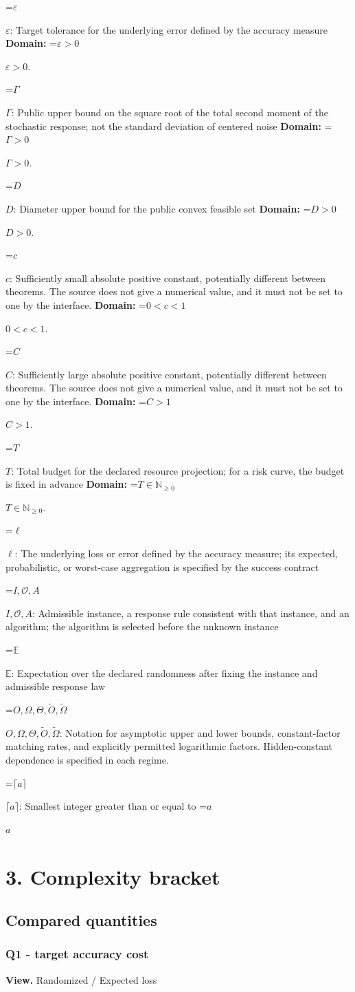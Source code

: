 \documentclass[10pt,a4paper]{article}
\newcommand{\AtlasMath}[1]{\par\begingroup\centering\setbox0=\hbox{$\displaystyle #1$}\ifdim\wd0>1.4\linewidth\typeout{ATLAS WIDE FORMULA: \the\wd0}\fi\ifdim\wd0>\linewidth\resizebox{\linewidth}{!}{\box0}\else\box0\fi\par\endgroup}
\newcommand{\AtlasInlineMath}[1]{\begingroup\setbox0=\hbox{$#1$}\ifdim\wd0>.4\linewidth\endgroup\AtlasMath{#1}\else\endgroup$#1$\fi}
\begin{document}
\AtlasInlineMath{\varepsilon}: Target tolerance for the underlying error defined by the accuracy measure \textbf{Domain:} \AtlasInlineMath{\varepsilon>0}.

\AtlasInlineMath{\Gamma}: Public upper bound on the square root of the total second moment of the stochastic response; not the standard deviation of centered noise \textbf{Domain:} \AtlasInlineMath{\Gamma>0}.

\AtlasInlineMath{D}: Diameter upper bound for the public convex feasible set \textbf{Domain:} \AtlasInlineMath{D>0}.

\AtlasInlineMath{c}: Sufficiently small absolute positive constant, potentially different between theorems. The source does not give a numerical value, and it must not be set to one by the interface. \textbf{Domain:} \AtlasInlineMath{0<c<1}.

\AtlasInlineMath{C}: Sufficiently large absolute positive constant, potentially different between theorems. The source does not give a numerical value, and it must not be set to one by the interface. \textbf{Domain:} \AtlasInlineMath{C>1}.

\AtlasInlineMath{T}: Total budget for the declared resource projection; for a risk curve, the budget is fixed in advance \textbf{Domain:} \AtlasInlineMath{T\in\mathbb{N}_{\ge0}}.

\AtlasInlineMath{\ell}: The underlying loss or error defined by the accuracy measure; its expected, probabilistic, or worst-case aggregation is specified by the success contract

\AtlasInlineMath{I,\mathcal{O},A}: Admissible instance, a response rule consistent with that instance, and an algorithm; the algorithm is selected before the unknown instance

\AtlasInlineMath{\mathbb{E}}: Expectation over the declared randomness after fixing the instance and admissible response law

\AtlasInlineMath{O,\Omega,\Theta,\widetilde{O},\widetilde\Omega}: Notation for asymptotic upper and lower bounds, constant-factor matching rates, and explicitly permitted logarithmic factors. Hidden-constant dependence is specified in each regime.

\AtlasInlineMath{\lceil a\rceil}: Smallest integer greater than or equal to \AtlasInlineMath{a}

\section{3. Complexity bracket}
\subsection{Compared quantities}
\subsubsection{Q1 - target accuracy cost}
\textbf{View.} Randomized / Expected loss
\end{document}

